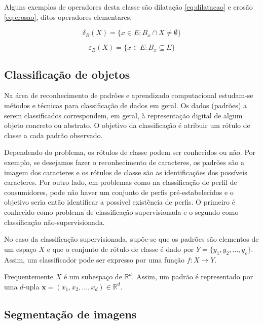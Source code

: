 \documentclass[a4paper,11pt]{article}
\begin{document}
    Alguns exemplos de operadores desta classe são dilatação \eqref{eq:dilatacao} e erosão \eqref{eq:erosao}, ditos operadores elementares.

    \begin{equation}
      \label{eq:dilatacao}
      \delta_{B}(X) = \{ x \in E \colon B_{x} \cap X \neq \emptyset \}
    \end{equation}

    \begin{equation}
      \label{eq:erosao}
      \varepsilon_{B}(X) = \{ x \in E \colon B_{x} \subseteq E \}
    \end{equation}

\subsection{Classificação de objetos}

Na área de reconhecimento de padrões e aprendizado computacional
estudam-se métodos e técnicas para classificação de dados em geral. Os
dados (padrões) a serem classificados correspondem, em geral, à
representação digital de algum objeto concreto ou abstrato. O objetivo
da classificação é atribuir um rótulo de classe a cada padrão
observado.

Dependendo do problema, os rótulos de classe podem ser conhecidos ou
não. Por exemplo, se desejamos fazer o reconhecimento de caracteres,
os padrões são a imagem dos caracteres e os rótulos de classe são as
identificações dos possíveis caracteres. Por outro lado, em problemas
como na classificação de perfil de consumidores, pode não haver um
conjunto de perfis pré-estabelecidos e o objetivo seria então
identificar a possível existência de perfis. O primeiro é conhecido
como problema de classificação supervisionada e o segundo como
classificação não-supervisionada.

No caso da classificação supervisionada, supõe-se que os padrões são
elementos de um espaço $X$ e que o conjunto de rótulo de classe é dado
por $Y=\{y_1,y_2,\ldots,y_c\}$. Assim, um classificador pode ser
expresso por uma função $f: X \to Y$.

Frequentemente $X$ é um subespaço de $\mathbb{R}^d$. Assim, um padrão
é representado por uma $d$-upla $\mathbf{x}=(x_1,x_2,\ldots,x_d) \in
\mathbb{R}^d$.

\subsection{Segmentação de imagens}
\end{document}
